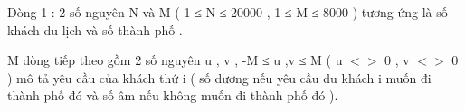 Dòng 1 : 2 số nguyên N và M ( 1 ≤ N ≤ 20000 , 1 ≤ M ≤ 8000 ) tương ứng là số khách du lịch và số thành phố .   


   M dòng tiếp theo gồm 2 số nguyên u , v , -M ≤ u ,v ≤ M ( u $<$$>$ 0 , v $<$$>$ 0 ) mô tả yêu cầu của khách thứ i ( số dương nếu yêu cầu du khách i muốn đi thành phố đó và số âm nếu không muốn đi thành phố đó ).